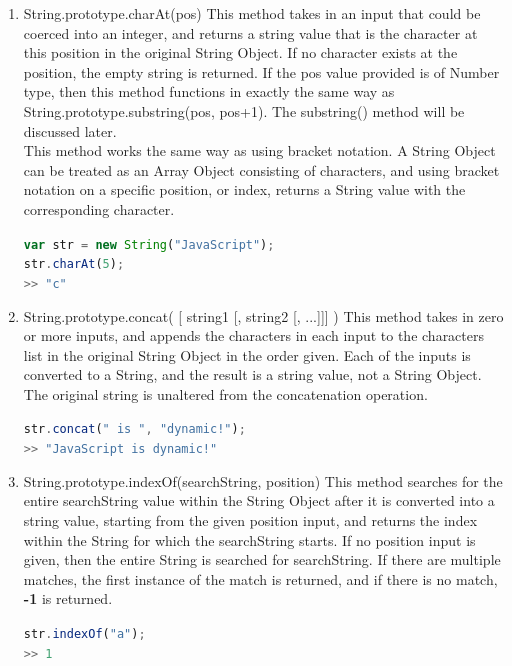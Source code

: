 \documentclass[a4paper,11pt,twoside]{report}
\def\jsinline{\lstinline[language=JavaScript, basicstyle=\small]}%\end{lstlisting}
\begin{document}
\begin{enumerate}
\item String.prototype.charAt(pos) \newline
This method takes in an input that could be coerced into an integer, and returns a string value that is the character at this position in the original String Object. If no character exists at the position, the empty string is returned. If the pos value provided is of Number type, then this method functions in exactly the same way as String.prototype.substring(pos, pos+1). The substring() method will be discussed later. \\
This method works the same way as using bracket notation. A String Object can be treated as an Array Object consisting of characters, and using bracket notation on a specific position, or index, returns a String value with the corresponding character.

\jsinline|var str = new String("JavaScript");| \\
\jsinline|str.charAt(5);| \\
\jsinline|>> "c"|

\item String.prototype.concat( [ string1 [, string2 [, ...]]] ) \newline
This method takes in zero or more inputs, and appends the characters in each input to the characters list in the original String Object in the order given. Each of the inputs is converted to a String, and the result is a string value, not a String Object. The original string is unaltered from the concatenation operation.

\jsinline|str.concat(" is ", "dynamic!");| \\
\jsinline|>> "JavaScript is dynamic!"|

\item String.prototype.indexOf(searchString, position) \newline
This method searches for the entire searchString value within the String Object after it is converted into a string value, starting from the given position input, and returns the index within the String for which the searchString starts. If no position input is given, then the entire String is searched for searchString. If there are multiple matches, the first instance of the match is returned, and if there is no match, \textbf{-1} is returned.

\jsinline|str.indexOf("a");| \\
\jsinline|>> 1|


\end{enumerate}
\end{document}
